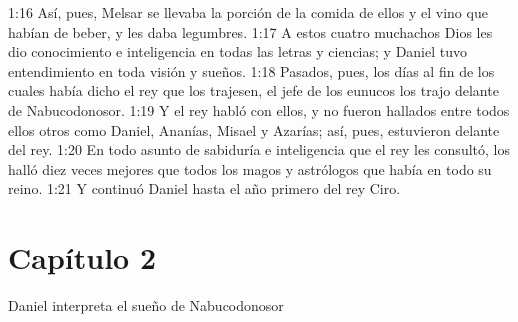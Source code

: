 1:16 Así, pues, Melsar se llevaba la porción de la comida de ellos y el vino que habían de beber, y les daba legumbres. 
1:17 A estos cuatro muchachos Dios les dio conocimiento e inteligencia en todas las letras y ciencias; y Daniel tuvo entendimiento en toda visión y sueños. 
1:18 Pasados, pues, los días al fin de los cuales había dicho el rey que los trajesen, el jefe de los eunucos los trajo delante de Nabucodonosor. 
1:19 Y el rey habló con ellos, y no fueron hallados entre todos ellos otros como Daniel, Ananías, Misael y Azarías; así, pues, estuvieron delante del rey. 
1:20 En todo asunto de sabiduría e inteligencia que el rey les consultó, los halló diez veces mejores que todos los magos y astrólogos que había en todo su reino. 
1:21 Y continuó Daniel hasta el año primero del rey Ciro. 
\section*{Capítulo 2 }
Daniel interpreta el sueño de Nabucodonosor 
 
